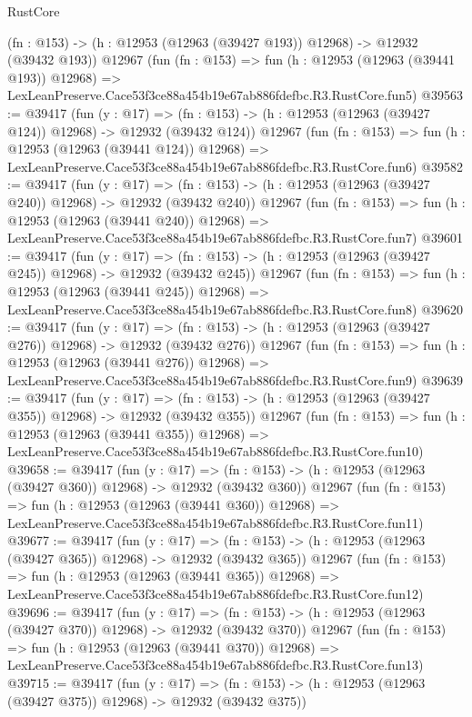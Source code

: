 \begin{lexlean}{RustCore}
\begin{coremodule}
    (fn : @153) -> (h : @12953 (@12963 (@39427 @193)) @12968) -> @12932 (@39432 @193))
    @12967
    (fun (fn : @153) =>
    fun (h : @12953 (@12963 (@39441 @193)) @12968) =>
    LexLeanPreserve.Cace53f3ce88a454b19e67ab886fdefbc.R3.RustCore.fun5)
@39563 := @39417
    (fun (y : @17) =>
    (fn : @153) -> (h : @12953 (@12963 (@39427 @124)) @12968) -> @12932 (@39432 @124))
    @12967
    (fun (fn : @153) =>
    fun (h : @12953 (@12963 (@39441 @124)) @12968) =>
    LexLeanPreserve.Cace53f3ce88a454b19e67ab886fdefbc.R3.RustCore.fun6)
@39582 := @39417
    (fun (y : @17) =>
    (fn : @153) -> (h : @12953 (@12963 (@39427 @240)) @12968) -> @12932 (@39432 @240))
    @12967
    (fun (fn : @153) =>
    fun (h : @12953 (@12963 (@39441 @240)) @12968) =>
    LexLeanPreserve.Cace53f3ce88a454b19e67ab886fdefbc.R3.RustCore.fun7)
@39601 := @39417
    (fun (y : @17) =>
    (fn : @153) -> (h : @12953 (@12963 (@39427 @245)) @12968) -> @12932 (@39432 @245))
    @12967
    (fun (fn : @153) =>
    fun (h : @12953 (@12963 (@39441 @245)) @12968) =>
    LexLeanPreserve.Cace53f3ce88a454b19e67ab886fdefbc.R3.RustCore.fun8)
@39620 := @39417
    (fun (y : @17) =>
    (fn : @153) -> (h : @12953 (@12963 (@39427 @276)) @12968) -> @12932 (@39432 @276))
    @12967
    (fun (fn : @153) =>
    fun (h : @12953 (@12963 (@39441 @276)) @12968) =>
    LexLeanPreserve.Cace53f3ce88a454b19e67ab886fdefbc.R3.RustCore.fun9)
@39639 := @39417
    (fun (y : @17) =>
    (fn : @153) -> (h : @12953 (@12963 (@39427 @355)) @12968) -> @12932 (@39432 @355))
    @12967
    (fun (fn : @153) =>
    fun (h : @12953 (@12963 (@39441 @355)) @12968) =>
    LexLeanPreserve.Cace53f3ce88a454b19e67ab886fdefbc.R3.RustCore.fun10)
@39658 := @39417
    (fun (y : @17) =>
    (fn : @153) -> (h : @12953 (@12963 (@39427 @360)) @12968) -> @12932 (@39432 @360))
    @12967
    (fun (fn : @153) =>
    fun (h : @12953 (@12963 (@39441 @360)) @12968) =>
    LexLeanPreserve.Cace53f3ce88a454b19e67ab886fdefbc.R3.RustCore.fun11)
@39677 := @39417
    (fun (y : @17) =>
    (fn : @153) -> (h : @12953 (@12963 (@39427 @365)) @12968) -> @12932 (@39432 @365))
    @12967
    (fun (fn : @153) =>
    fun (h : @12953 (@12963 (@39441 @365)) @12968) =>
    LexLeanPreserve.Cace53f3ce88a454b19e67ab886fdefbc.R3.RustCore.fun12)
@39696 := @39417
    (fun (y : @17) =>
    (fn : @153) -> (h : @12953 (@12963 (@39427 @370)) @12968) -> @12932 (@39432 @370))
    @12967
    (fun (fn : @153) =>
    fun (h : @12953 (@12963 (@39441 @370)) @12968) =>
    LexLeanPreserve.Cace53f3ce88a454b19e67ab886fdefbc.R3.RustCore.fun13)
@39715 := @39417
    (fun (y : @17) =>
    (fn : @153) -> (h : @12953 (@12963 (@39427 @375)) @12968) -> @12932 (@39432 @375))

\end{coremodule}
\end{lexlean}

